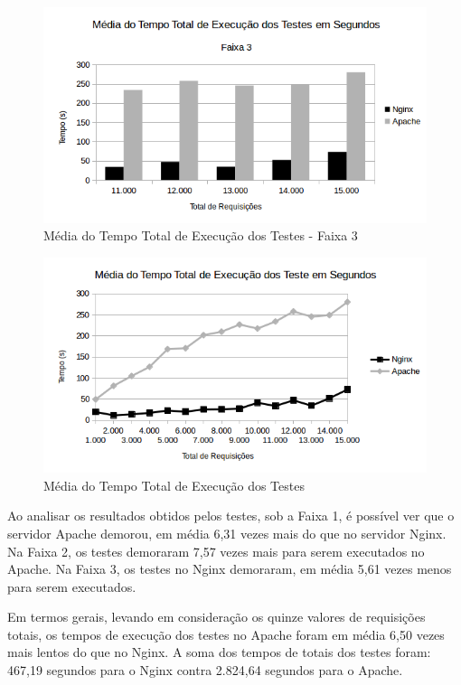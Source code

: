 \begin{figure}[H]
	\centering
	\includegraphics[width=1\linewidth]{graficos/grafico1-f3} 
	\caption{Média do Tempo Total de Execução dos Testes - Faixa 3}
	\label{fig:grafico1-f3}
\end{figure}

\begin{figure}[H]
	\centering
	\includegraphics[width=1\linewidth]{graficos/grafico1} 
	\caption{Média do Tempo Total de Execução dos Testes}
	\label{fig:grafico1}
\end{figure}

Ao analisar os resultados obtidos pelos testes, sob a Faixa 1, é possível ver 
que o servidor Apache demorou, em média 6,31 vezes mais do que no servidor 
Nginx. 
Na Faixa 2, os testes demoraram 7,57 vezes mais para serem executados no 
Apache. Na Faixa 3, os testes no Nginx demoraram, em média 5,61 vezes menos 
para serem executados.

Em termos gerais, levando em consideração os quinze valores de requisições 
totais, os tempos de execução dos testes no Apache foram em média 6,50 vezes 
mais lentos do que no Nginx. A soma dos tempos de totais dos testes foram: 
467,19 segundos para o Nginx contra 2.824,64 segundos para o Apache.

